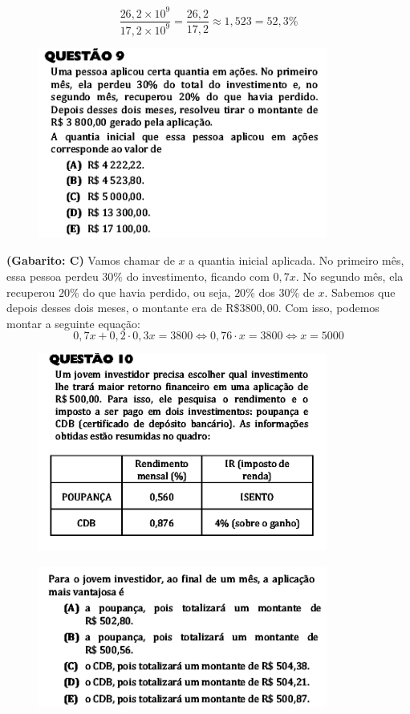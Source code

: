 \documentclass[a4paper]{article}
\begin{document}
\begin{equation*}
\frac{26,2\times 10^9}{17,2\times 10^9} = \frac{26,2}{17,2} \approx 1,523 = 52,3\%
\end{equation*}
\begin{figure}[H]
	\begin{center}
		\includegraphics[width=9.5cm]{L3Q9.png}
	\end{center}
\end{figure}
\par\textbf{(Gabarito: C)} Vamos chamar de $x$ a quantia inicial aplicada. No primeiro mês, essa pessoa perdeu $30\%$ do investimento, ficando com $0,7x$. No segundo mês, ela recuperou $20\%$ do que havia perdido, ou seja, $20\%$ dos $30\%$ de $x$. Sabemos que depois desses dois meses, o montante era de $\text{R\$}3800,00$. Com isso, podemos montar a seguinte equação: 
\begin{equation*}
0,7x + 0,2\cdot 0,3x = 3800 \iff 0,76\cdot x = 3800 \iff x = 5000
\end{equation*}
\begin{figure}[H]
	\begin{center}
		\includegraphics[width=9.5cm]{L3Q10_1.png}
	\end{center}
\end{figure}
\begin{figure}[H]
	\begin{center}
		\includegraphics[width=9.5cm]{L3Q10_2.png}
	\end{center}
\end{figure}
\end{document}
